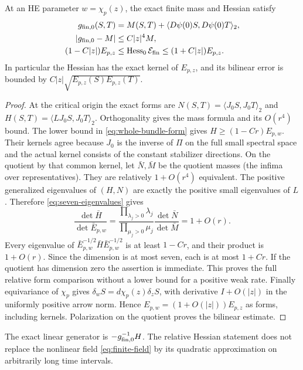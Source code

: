\begin{corollary}\label{cor:relative-finite-hessian}
At an HE parameter $w=\chi_p(z)$, the exact finite mass
and Hessian satisfy
\begin{equation}\label{eq:finite-mass-hessian}
 \begin{split}
 g_{{\rm fin},0}(S,T)
   &=M(S,T)+\langle D\psi(0)S,D\psi(0)T\rangle_2,\\
 |g_{{\rm fin},0}-M|&\le C|z|^4M,\\
 (1-C|z|)E_{p,z}&\le\operatorname{Hess}_0\mathcal E_{\rm fin}
                                             \le(1+C|z|)E_{p,z}.
 \end{split}
\end{equation}
In particular the Hessian has the exact kernel of $E_{p,z}$,
and its bilinear error is bounded by
$C|z|\sqrt{E_{p,z}(S)E_{p,z}(T)}$.
\end{corollary}

\begin{proof}
At the critical origin the exact forms are
$N(S,T)=\langle J_0S,J_0T\rangle_2$ and
$H(S,T)=\langle LJ_0S,J_0T\rangle_2$.
Orthogonality gives the mass formula and its $O(r^4)$ bound.
The lower bound in \eqref{eq:whole-bundle-form} gives
$H\ge(1-Cr)E_{p,w}$.
Their kernels agree because $J_0$ is the inverse of
$\Pi$ on the full small spectral space and the actual
kernel consists of the constant stabilizer directions.
On the quotient by that common kernel, let $\bar N,\bar M$
be the quotient masses (the infima over representatives).
They are relatively $1+O(r^4)$ equivalent.
The positive generalized eigenvalues of $(H,N)$ are exactly
the positive small eigenvalues of $L$. Therefore
\eqref{eq:seven-eigenvalues} gives
\[
 \frac{\det\bar H}{\det\bar E_{p,w}}
  =\frac{\prod_{\lambda_j>0}\lambda_j}
         {\prod_{\mu_j>0}\mu_j}
                           \frac{\det\bar N}{\det\bar M}
  =1+O(r).
\]
Every eigenvalue of $\bar E_{p,w}^{-1/2}\bar H
\bar E_{p,w}^{-1/2}$ is at least $1-Cr$, and their
product is $1+O(r)$. Since the dimension is at most seven,
each is at most $1+Cr$. If the quotient has dimension
zero the assertion is immediate. This proves the full
relative form comparison without a lower bound for a
positive weak rate.
Finally equivariance of $\chi_p$ gives
$\delta_wS=d\chi_p(z)\delta_zS$, with derivative
$I+O(|z|)$ in the uniformly positive arrow norm.
Hence $E_{p,w}=(1+O(|z|))E_{p,z}$ as forms, including
kernels. Polarization on the quotient proves the
bilinear estimate.
\end{proof}

The exact linear generator is $-g_{{\rm fin},0}^{-1}H$.
The relative Hessian statement does not replace the
nonlinear field \eqref{eq:finite-field} by its quadratic
approximation on arbitrarily long time intervals.

